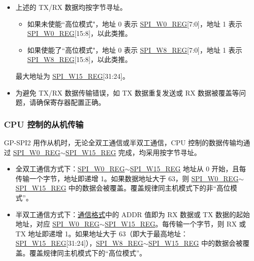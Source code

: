\documentclass[main\_\_CN.tex]{subfiles}
\begin{document}
\begin{tiplisting}
\vspace{-2em}
\begin{itemize}
    \item 上述的 TX/RX 数据均按字节寻址。
    \begin{itemize}
        \item 如果未使能``高位模式"，地址 0 表示 \hyperref[regdesc:SPIW0REG]{SPI\_W0\_REG}[7:0]，地址 1 表示 \hyperref[regdesc:SPIW0REG]{SPI\_W0\_REG}[15:8]，以此类推。
        \item 如果使能了``高位模式"，地址 0 表示 \hyperref[regdesc:SPIW8REG]{SPI\_W8\_REG}[7:0]，地址 1 表示 \hyperref[regdesc:SPIW8REG]{SPI\_W8\_REG}[15:8]，以此类推。
    \end{itemize}
    最大地址为 \hyperref[regdesc:SPIW15REG]{SPI\_W15\_REG}[31:24]。
    \item 为避免 TX/RX 数据传输错误，如 TX 数据重复发送或 RX 数据被覆盖等问题，请确保寄存器配置正确。
\end{itemize}
\end{tiplisting}

\subsubsection{CPU 控制的从机传输} \label{GP-SPI2 slave CPU}

GP-SPI2 用作从机时，无论全双工通信或半双工通信，CPU 控制的数据传输均通过 \hyperref[regdesc:SPIW0REG]{SPI\_W0\_REG}$\sim$\hyperref[regdesc:SPIW15REG]{SPI\_W15\_REG} 完成，均采用按字节寻址。

\begin{itemize}
    \item 全双工通信方式下：\hyperref[regdesc:SPIW0REG]{SPI\_W0\_REG}$\sim$\hyperref[regdesc:SPIW15REG]{SPI\_W15\_REG} 地址从 0 开始，且每传输一个字节，地址即递增 1。如果数据地址大于 63，则 \hyperref[regdesc:SPIW0REG]{SPI\_W0\_REG}$\sim$\hyperref[regdesc:SPIW15REG]{SPI\_W15\_REG} 中的数据会被覆盖。覆盖规律同主机模式下的非“高位模式”。
    \item 半双工通信方式下：\hyperref[slave communication format]{通信格式}中的 ADDR 值即为 RX 数据或 TX 数据的起始地址，对应 \hyperref[regdesc:SPIW0REG]{SPI\_W0\_REG}$\sim$\hyperref[regdesc:SPIW15REG]{SPI\_W15\_REG}。每传输一个字节，则 RX 或 TX 地址即递增 1。如果地址大于 63（即大于最高地址：\hyperref[regdesc:SPIW15REG]{SPI\_W15\_REG}[31:24]），\hyperref[regdesc:SPIW8REG]{SPI\_W8\_REG}$\sim$\hyperref[regdesc:SPIW15REG]{SPI\_W15\_REG} 中的数据会被覆盖。覆盖规律同主机模式下的“高位模式”。
\end{itemize}
\end{document}
